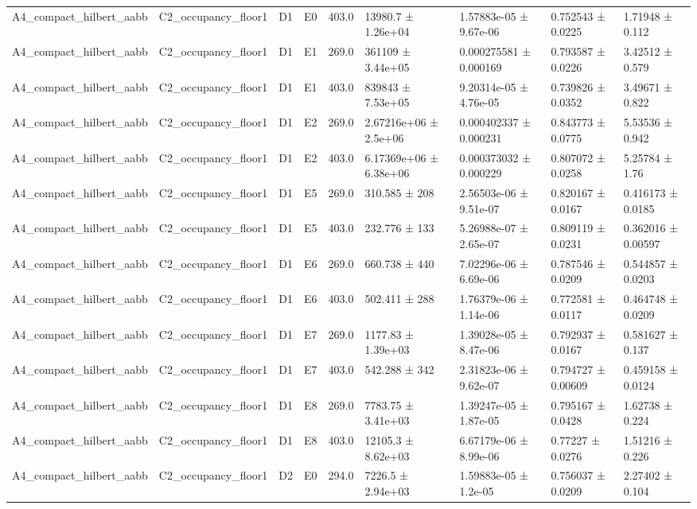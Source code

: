 \begin{table}
\begin{tabular}{lllllllll}
A4\_compact\_hilbert\_aabb & C2\_occupancy\_floor1 & D1 & E0 & 403.0 & 13980.7 ± 1.26e+04 & 1.57883e-05 ± 9.67e-06 & 0.752543 ± 0.0225 & 1.71948 ± 0.112 \\
A4\_compact\_hilbert\_aabb & C2\_occupancy\_floor1 & D1 & E1 & 269.0 & 361109 ± 3.44e+05 & 0.000275581 ± 0.000169 & 0.793587 ± 0.0226 & 3.42512 ± 0.579 \\
A4\_compact\_hilbert\_aabb & C2\_occupancy\_floor1 & D1 & E1 & 403.0 & 839843 ± 7.53e+05 & 9.20314e-05 ± 4.76e-05 & 0.739826 ± 0.0352 & 3.49671 ± 0.822 \\
A4\_compact\_hilbert\_aabb & C2\_occupancy\_floor1 & D1 & E2 & 269.0 & 2.67216e+06 ± 2.5e+06 & 0.000402337 ± 0.000231 & 0.843773 ± 0.0775 & 5.53536 ± 0.942 \\
A4\_compact\_hilbert\_aabb & C2\_occupancy\_floor1 & D1 & E2 & 403.0 & 6.17369e+06 ± 6.38e+06 & 0.000373032 ± 0.000229 & 0.807072 ± 0.0258 & 5.25784 ± 1.76 \\
A4\_compact\_hilbert\_aabb & C2\_occupancy\_floor1 & D1 & E5 & 269.0 & 310.585 ± 208 & 2.56503e-06 ± 9.51e-07 & 0.820167 ± 0.0167 & 0.416173 ± 0.0185 \\
A4\_compact\_hilbert\_aabb & C2\_occupancy\_floor1 & D1 & E5 & 403.0 & 232.776 ± 133 & 5.26988e-07 ± 2.65e-07 & 0.809119 ± 0.0231 & 0.362016 ± 0.00597 \\
A4\_compact\_hilbert\_aabb & C2\_occupancy\_floor1 & D1 & E6 & 269.0 & 660.738 ± 440 & 7.02296e-06 ± 6.69e-06 & 0.787546 ± 0.0209 & 0.544857 ± 0.0203 \\
A4\_compact\_hilbert\_aabb & C2\_occupancy\_floor1 & D1 & E6 & 403.0 & 502.411 ± 288 & 1.76379e-06 ± 1.14e-06 & 0.772581 ± 0.0117 & 0.464748 ± 0.0209 \\
A4\_compact\_hilbert\_aabb & C2\_occupancy\_floor1 & D1 & E7 & 269.0 & 1177.83 ± 1.39e+03 & 1.39028e-05 ± 8.47e-06 & 0.792937 ± 0.0167 & 0.581627 ± 0.137 \\
A4\_compact\_hilbert\_aabb & C2\_occupancy\_floor1 & D1 & E7 & 403.0 & 542.288 ± 342 & 2.31823e-06 ± 9.62e-07 & 0.794727 ± 0.00609 & 0.459158 ± 0.0124 \\
A4\_compact\_hilbert\_aabb & C2\_occupancy\_floor1 & D1 & E8 & 269.0 & 7783.75 ± 3.41e+03 & 1.39247e-05 ± 1.87e-05 & 0.795167 ± 0.0428 & 1.62738 ± 0.224 \\
A4\_compact\_hilbert\_aabb & C2\_occupancy\_floor1 & D1 & E8 & 403.0 & 12105.3 ± 8.62e+03 & 6.67179e-06 ± 8.99e-06 & 0.77227 ± 0.0276 & 1.51216 ± 0.226 \\
A4\_compact\_hilbert\_aabb & C2\_occupancy\_floor1 & D2 & E0 & 294.0 & 7226.5 ± 2.94e+03 & 1.59883e-05 ± 1.2e-05 & 0.756037 ± 0.0209 & 2.27402 ± 0.104 \\

\end{tabular}
\end{table}

